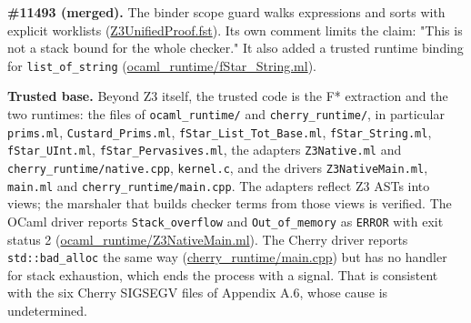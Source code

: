 \documentclass[10pt,a4paper]{article}
\begin{document}
\textbf{\#11493 (merged).} The binder scope guard walks expressions and sorts with explicit worklists (\href{https://github.com/Z3Prover/z3/blob/8fbb275aba0472e862e289c7af1331b3bd5d512c/fstar/Z3UnifiedProof.fst\#L573-L590}{Z3Unified\allowbreak{}Proof.\allowbreak{}fst}). Its own comment limits the claim: "This is not a stack bound for the whole checker." It also added a trusted runtime binding for \texttt{list\_\allowbreak{}of\_\allowbreak{}string} (\href{https://github.com/Z3Prover/z3/blob/8fbb275aba0472e862e289c7af1331b3bd5d512c/fstar/ocaml_runtime/fStar_String.ml}{ocaml\_\allowbreak{}runtime/\allowbreak{}f\allowbreak{}Star\_\allowbreak{}String.\allowbreak{}ml}).

\textbf{Trusted base.} Beyond Z3 itself, the trusted code is the F* extraction and the two runtimes: the files of \texttt{ocaml\_\allowbreak{}runtime/\allowbreak{}} and \texttt{cherry\_\allowbreak{}runtime/\allowbreak{}}, in particular \texttt{prims.\allowbreak{}ml}, \texttt{Custard\_\allowbreak{}Prims.\allowbreak{}ml}, \texttt{fStar\_\allowbreak{}List\_\allowbreak{}Tot\_\allowbreak{}Base.\allowbreak{}ml}, \texttt{fStar\_\allowbreak{}String.\allowbreak{}ml}, \texttt{fStar\_\allowbreak{}UInt.\allowbreak{}ml}, \texttt{fStar\_\allowbreak{}Pervasives.\allowbreak{}ml}, the adapters \texttt{Z3Native.\allowbreak{}ml} and \texttt{cherry\_\allowbreak{}runtime/\allowbreak{}native.\allowbreak{}cpp}, \texttt{kernel.\allowbreak{}c}, and the drivers \texttt{Z3NativeMain.\allowbreak{}ml}, \texttt{main.\allowbreak{}ml} and \texttt{cherry\_\allowbreak{}runtime/\allowbreak{}main.\allowbreak{}cpp}. The adapters reflect Z3 ASTs into views; the marshaler that builds checker terms from those views is verified. The OCaml driver reports \texttt{Stack\_\allowbreak{}overflow} and \texttt{Out\_\allowbreak{}of\_\allowbreak{}memory} as \texttt{ERROR} with exit status 2 (\href{https://github.com/Z3Prover/z3/blob/8fbb275aba0472e862e289c7af1331b3bd5d512c/fstar/ocaml_runtime/Z3NativeMain.ml\#L378-L383}{ocaml\_\allowbreak{}runtime/\allowbreak{}Z3Native\allowbreak{}Main.\allowbreak{}ml}). The Cherry driver reports \texttt{std:\allowbreak{}:\allowbreak{}bad\_\allowbreak{}alloc} the same way (\href{https://github.com/Z3Prover/z3/blob/8fbb275aba0472e862e289c7af1331b3bd5d512c/fstar/cherry_runtime/main.cpp\#L652-L666}{cherry\_\allowbreak{}runtime/\allowbreak{}main.\allowbreak{}cpp}) but has no handler for stack exhaustion, which ends the process with a signal. That is consistent with the six Cherry SIGSEGV files of Appendix A.6, whose cause is undetermined.
\end{document}
